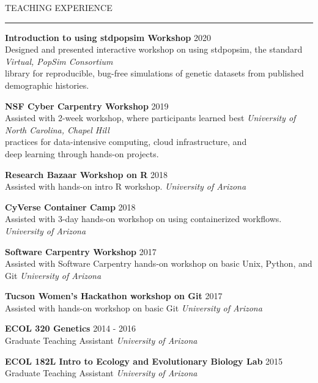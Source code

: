 \documentclass{resume} %
\renewenvironment{rSection}[1]{
\sectionskip
\textcolor{RoyalPurple}{\MakeUppercase{#1}}
\sectionlineskip
\hrule
\begin{list}{}{
\setlength{\leftmargin}{1.5em}
}
\item[]
}{
\end{list}
}
\begin{document}
\begin{rSection}{Teaching Experience}
    
    {\bf Introduction to using stdpopsim Workshop} \hfill 2020\\
    Designed and presented interactive workshop on using stdpopsim, 
    the standard \hspace*{\fill} {\em Virtual, PopSim Consortium} \\  
    library for reproducible, bug-free simulations of genetic datasets from published \\
    demographic histories.

    {\bf NSF Cyber Carpentry Workshop} \hfill 2019\\
    Assisted with 2-week workshop, where participants learned best \hspace*{\fill} {\em University of North Carolina, Chapel Hill} \\ 
    practices for data-intensive computing, cloud infrastructure, and\\ 
    deep learning through hands-on projects.

    {\bf Research Bazaar Workshop on R} \hfill 2018\\ 
    Assisted with hands-on intro R workshop. \hspace*{\fill} {\em University of Arizona}

    {\bf CyVerse Container Camp} \hfill 2018\\
    Assisted with 3-day hands-on workshop on using containerized workflows. \hspace*{\fill} {\em University of Arizona}

    {\bf Software Carpentry Workshop} \hfill 2017\\
    Assisted with Software Carpentry hands-on workshop on basic Unix, Python, and Git \hspace*{\fill} {\em University of Arizona}

    {\bf Tucson Women’s Hackathon workshop on Git} \hfill 2017\\ 
    Assisted with hands-on workshop on basic Git \hspace*{\fill} {\em University of Arizona}

    {\bf ECOL 320 Genetics} \hfill 2014 - 2016\\ 
    Graduate Teaching Assistant \hspace*{\fill} {\em University of Arizona}

    {\bf ECOL 182L Intro to Ecology and Evolutionary Biology Lab} \hfill 2015\\
    Graduate Teaching Assistant \hspace*{\fill} {\em University of Arizona}


\end{rSection}
\end{document}
